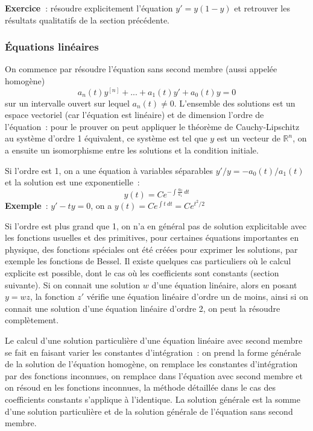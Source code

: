 \documentclass[a4paper,11pt]{article}
\begin{document}
\begin{giacjshere}
{\bf Exercice~}: r\'esoudre explicitement l'\'equation $y'=y(1-y)$
et retrouver les r\'esultats qualitatifs de la section pr\'ec\'edente. \\

\subsubsection{\'Equations lin\'eaires}
On commence par r\'esoudre l'\'equation sans second membre
(aussi appel\'ee homog\`ene)
$$ a_n(t) y^{[n]} +...+a_1(t)y'+a_0(t)y=0$$
sur un intervalle ouvert sur lequel $a_n(t) \neq 0$. 
L'ensemble des solutions est un espace vectoriel (car l'\'equation
est lin\'eaire) et de dimension l'ordre de
l'\'equation~: pour le prouver on peut appliquer le th\'eor\`eme
de Cauchy-Lipschitz au syst\`eme d'ordre 1 \'equivalent, ce
syst\`eme est tel que $y$ est un vecteur de $\mathbb{R}^n$, on a ensuite
un isomorphisme entre les solutions et la condition initiale.

Si l'ordre est 1, on a une \'equation \`a variables s\'eparables
$ y'/y=-a_0(t)/a_1(t)$ et la solution est une exponentielle~:
$$ y(t)=Ce^{-\int \frac{a_0}{a_1} \ dt}$$
{\bf Exemple}~: $y'-ty=0$, on a $y(t)=Ce^{\int t \ dt}=Ce^{t^2/2}$

Si l'ordre est plus grand que 1, on n'a en g\'en\'eral pas de solution
explicitable avec les fonctions usuelles et des primitives, 
pour certaines \'equations importantes en physique, 
des fonctions sp\'eciales
ont \'et\'e cr\'e\'ees pour exprimer les solutions, par
exemple les fonctions de Bessel. Il existe quelques
cas particuliers o\`u le calcul explicite est possible, dont
le cas o\`u les coefficients sont constants (section suivante).
Si on connait une solution $w$ d'une \'equation lin\'eaire, alors 
en posant $y=wz$, la fonction $z'$ v\'erifie une \'equation lin\'eaire
d'ordre un de moins, ainsi si on connait une solution d'une \'equation
lin\'eaire d'ordre 2, on peut la r\'esoudre compl\`etement.

Le calcul d'une solution particuli\`ere 
d'une \'equation lin\'eaire avec second
membre se fait en faisant varier les constantes d'int\'egration~:
on prend la forme g\'en\'erale de la solution de l'\'equation
homog\`ene,
on remplace les constantes d'int\'egration par des fonctions inconnues,
on remplace dans l'\'equation avec second membre et on
r\'esoud en les fonctions inconnues, la m\'ethode d\'etaill\'ee
dans le cas des coefficients constants s'applique \`a l'identique.
La solution g\'en\'erale est la somme d'une solution particuli\`ere
et de la solution g\'en\'erale de l'\'equation sans second membre.


\end{giacjshere}
\end{document}
